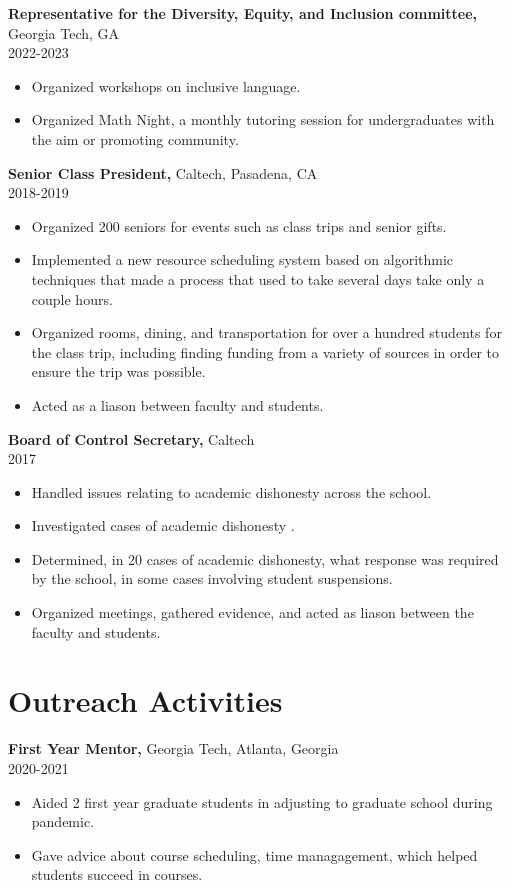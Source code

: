 \documentclass[margin]{res}
\begin{document}
\begin{resume}
       {\bf Representative for the Diversity, Equity, and Inclusion committee,} Georgia Tech, GA    \\         2022-2023
        \begin{itemize} \itemsep -2pt
          \item Organized workshops on inclusive language.
          \item Organized Math Night, a monthly tutoring session for undergraduates with the aim or promoting community.
		 \end{itemize}

       {\bf Senior Class President,} Caltech, Pasadena, CA    \\         2018-2019 
        \begin{itemize} \itemsep -2pt
          \item Organized 200 seniors for events such as class trips and senior gifts.
          \item Implemented a new resource scheduling system based on algorithmic techniques that made a process that used to take several days take only a couple hours.
          \item Organized rooms, dining, and transportation for over a hundred students for the class trip, including finding funding from a variety of sources in order to ensure the trip was possible.
          \item Acted as a liason between faculty and students.
		 \end{itemize}

		{\bf Board of Control Secretary,} Caltech \\   2017
        \begin{itemize} \itemsep -2pt
             \item Handled issues relating to academic dishonesty across the school.
             \item Investigated cases of academic dishonesty .
             \item Determined, in 20 cases of academic dishonesty, what response was required by the school, in some cases involving student suspensions.
             \item Organized meetings, gathered evidence, and acted as liason between the faculty and students.
		 \end{itemize}

\section{Outreach   Activities} 
       {\bf First Year Mentor,} Georgia Tech, Atlanta, Georgia     \\         2020-2021 
        \begin{itemize} \itemsep -2pt
            \item Aided 2 first year graduate students in adjusting to graduate school during pandemic.
          \item Gave advice about course scheduling, time managagement, which helped students succeed in courses.
		 \end{itemize}


\end{resume}
\end{document}
